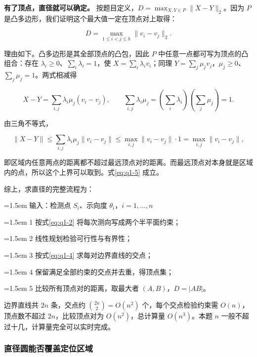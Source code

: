 \textbf{有了顶点，直径就可以确定。} 按题目定义，$D=\max_{X,Y\in P}\|X-Y\|_2$。因为 $P$ 是凸多边形，我们证明这个最大值一定在顶点对上取得：

\begin{equation}\label{eq:q1-5}
D=\max_{1\le i<j\le h}\|v_i-v_j\|_2 .
\end{equation}

理由如下。凸多边形是其全部顶点的凸包，因此 $P$ 中任意一点都可写为顶点的凸组合：存在 $\lambda_i\ge0$、$\sum_i\lambda_i=1$，使 $X=\sum_i\lambda_iv_i$；同理 $Y=\sum_j\mu_jv_j$，$\mu_j\ge0$、$\sum_j\mu_j=1$。两式相减得

\[
X-Y=\sum_{i,j}\lambda_i\mu_j(v_i-v_j),
\qquad
\sum_{i,j}\lambda_i\mu_j=\left(\sum_i\lambda_i\right)\left(\sum_j\mu_j\right)=1 .
\]

由三角不等式，

\[
\|X-Y\|\le\sum_{i,j}\lambda_i\mu_j\|v_i-v_j\|\le\max_{i,j}\|v_i-v_j\|\cdot1=\max_{i,j}\|v_i-v_j\|,
\]

即区域内任意两点的距离都不超过最远顶点对的距离。而最远顶点对本身就是区域内的点，所以这个上界可以取到。式\eqref{eq:q1-5} 成立。

综上，求直径的完整流程为：

\begin{tcolorbox}[colback=black!2,colframe=black!22,boxrule=0.4pt,arc=0pt,left=9pt,right=9pt,top=7pt,bottom=7pt]
\small\setlength{\parskip}{2pt}
\noindent\hangindent=1.5em 输入：检测点 $S_i$、示向度 $\theta_i$，$i=1,\dots,n$\par
\noindent\hangindent=1.5em 1  按式\eqref{eq:q1-2} 将每次测向写成两个半平面约束；\par
\noindent\hangindent=1.5em 2  线性规划检验可行性与有界性；\par
\noindent\hangindent=1.5em 3  按式\eqref{eq:q1-4} 求每对边界直线的交点；\par
\noindent\hangindent=1.5em 4  保留满足全部约束的交点并去重，得顶点集；\par
\noindent\hangindent=1.5em 5  比较所有顶点对的距离，取最大者 $(A,B)$，$D=|AB|$。\par
\end{tcolorbox}

边界直线共 $2n$ 条，交点约 $\binom{2n}{2}=O(n^2)$ 个，每个交点检验约束需 $O(n)$，顶点数不超过 $2n$，比较顶点对为 $O(n^2)$，总计算量 $O(n^3)$。本题 $n$ 一般不超过十几，计算量完全可以实时完成。

\subsubsection{直径圆能否覆盖定位区域}\label{sec:q1-3}

